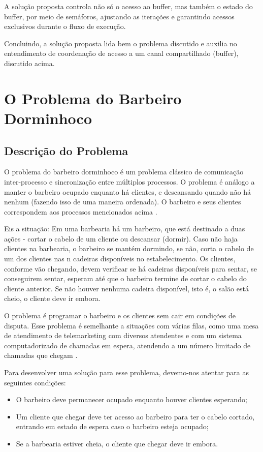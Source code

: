 \documentclass[
	12pt,				%
	openright,			%
	oneside,			%
	a4paper,			%
	chapter=TITLE,		%
	english,			%
	french,				%
	spanish,			%
	brazil				%
	]{abntex2}
\theoremstyle{definition}
\begin{document}
A solução proposta controla não só o acesso ao buffer, mas também o estado do buffer, por meio de semáforos, ajustando as iterações e garantindo acessos exclusivos durante o fluxo de execução.

Concluindo, a solução proposta lida bem o problema discutido e auxilia no entendimento de coordenação de acesso a um canal compartilhado (buffer), discutido acima.


\chapter{O Problema do Barbeiro Dorminhoco}
\section{Descrição do Problema}
O problema do barbeiro dorminhoco é um problema clássico de comunicação inter-processo e sincronização entre múltiplos processos. O problema é análogo a manter o barbeiro ocupado enquanto há clientes, e descansando quando não há nenhum (fazendo isso de uma maneira ordenada). O barbeiro e seus clientes correspondem aos processos mencionados acima \cite{barbeiro-dorminhoco}. 

Eis a situação: Em uma barbearia há um barbeiro, que está destinado a duas ações - cortar o cabelo de um cliente ou descansar (dormir). Caso não haja clientes na barbearia, o barbeiro se mantém dormindo, se não, corta o cabelo de um dos clientes nas n cadeiras disponíveis no estabelecimento. Os clientes, conforme vão chegando, devem verificar se há cadeiras disponíveis para sentar, se conseguirem sentar, esperam até que o barbeiro termine de cortar o cabelo do cliente anterior. Se não houver nenhuma cadeira disponível, isto é, o salão está cheio, o cliente deve ir embora. 

O problema é programar o barbeiro e os clientes sem cair em condições de disputa. Esse problema é semelhante a situações com várias filas, como uma mesa de atendimento de telemarketing com diversos atendentes e com um sistema computadorizado de chamadas em espera, atendendo a um número limitado de chamadas que chegam \cite{barbeiro-dorminhoco}.

Para desenvolver uma solução para esse problema, devemo-nos atentar para as seguintes condições:
\begin{itemize}
    \item O barbeiro deve permanecer ocupado enquanto houver clientes esperando;
    \item Um cliente que chegar deve ter acesso ao barbeiro para ter o cabelo cortado, entrando em estado de espera caso o barbeiro esteja ocupado;
    \item Se a barbearia estiver cheia, o cliente que chegar deve ir embora.
\end{itemize}
\end{document}
